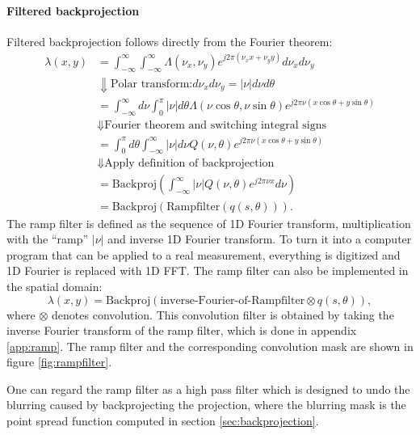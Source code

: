 \documentclass[11pt,oneside]{article}
\begin{document}
\paragraph{Filtered backprojection}
Filtered backprojection follows directly from the Fourier theorem:
\begin{align}
  \lambda(x,y) &= \int_{-\infty}^{\infty} \int_{-\infty}^{\infty}
         \Lambda(\nu_x, \nu_y) e^{j2\pi (\nu_x x + \nu_y y)} d \nu_x d \nu_y\\
      &\Downarrow \mbox{Polar transform:} d \nu_x d \nu_y = |\nu|
         d\nu d\theta \nonumber\\
      &= \int_{-\infty}^{\infty} d\nu \int_0^\pi |\nu| d\theta
            \Lambda(\nu \cos \theta, \nu \sin \theta)
            e^{j2\pi \nu (x \cos \theta + y \sin \theta)}\\
      &\Downarrow \mbox{Fourier theorem and switching integral signs}
               \nonumber\\
      &= \int_0^\pi d\theta \int_{-\infty}^{\infty} |\nu| d\nu
            Q(\nu, \theta) e^{j2\pi \nu (x \cos \theta + y \sin \theta)}\\
      &\Downarrow \mbox{Apply definition of backprojection} \nonumber\\
      &= \mbox{Backproj} \left( \int_{-\infty}^{\infty}
            |\nu| Q(\nu, \theta) e^{j2\pi \nu x} d\nu \right)\\
      &= \mbox{Backproj}\left( \mbox{Rampfilter} \left( q(s,\theta) \right)
            \right).
\end{align}
The ramp filter is defined as the sequence of 1D Fourier transform,
multiplication with the ``ramp'' $| \nu |$ and inverse 1D Fourier
transform.  To turn it into a computer program that can be applied to
a real measurement, everything is digitized and 1D Fourier is replaced
with 1D FFT. The ramp filter can also be implemented in the spatial
domain:
\begin{equation}
  \lambda(x,y) = \mbox{Backproj}\left( \mbox{inverse-Fourier-of-Rampfilter} 
                  \otimes q(s, \theta) \right),
\end{equation}
where $\otimes$ denotes convolution. This convolution filter is
obtained by taking the inverse Fourier transform of the ramp filter,
which is done in appendix \ref{app:ramp}. The ramp filter and the
corresponding convolution mask are shown in figure
\ref{fig:rampfilter}.

One can regard the ramp filter as a high pass filter which is designed to undo
the blurring caused by backprojecting the projection, where the blurring mask
is the point spread function computed in section \ref{sec:backprojection}.
\end{document}
